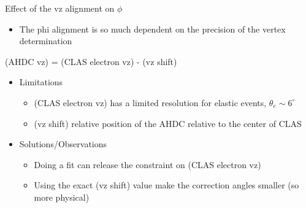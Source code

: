 \documentclass[10pt,aspectratio=43]{beamer}
\begin{document}
\begin{frame}{Effect of the vz alignment on $\phi$}
    \begin{itemize}
        \item The phi alignment is so much dependent on the precision of the vertex determination
    \end{itemize}

    \begin{center}
        (AHDC vz) = {\color{red}(CLAS electron vz)} - {\color{blue}(vz shift)}
    \end{center}

    \begin{itemize}
        \item Limitations
            \begin{itemize}
                \item {\color{red}(CLAS electron vz)} has a limited resolution for elastic events, $\theta_{e} \sim 6^\circ$
                \item {\color{blue}(vz shift)} relative position of the AHDC relative to the center of CLAS
            \end{itemize}
    \end{itemize}

    \begin{itemize}
        \item Solutions/Observations
            \begin{itemize}
                \item Doing a fit can release the constraint on {\color{red}(CLAS electron vz)}
                \item Using the exact {\color{blue}(vz shift)} value make the correction angles smaller (so more physical)
            \end{itemize}
    \end{itemize}


\end{frame}
\end{document}
